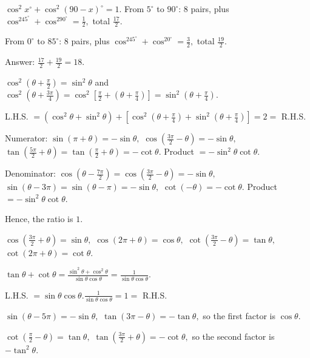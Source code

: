   $\cos^2x^\circ + \cos^2(90 - x)^\circ = 1.$ From $5^\circ$ to $90^\circ$: $8$ pairs, plus $\cos^245^\circ + \cos^290^\circ =
  \frac{1}{2},$ total $\frac{17}{2}.$

  From $0^\circ$ to $85^\circ$: $8$ pairs, plus $\cos^245^\circ + \cos^20^\circ = \frac{3}{2},$ total $\frac{19}{2}.$

  Answer: $\frac{17}{2} + \frac{19}{2} = 18.$

\item $\cos^2\left(\theta + \frac{\pi}{2}\right) = \sin^2\theta$ and $\cos^2\left(\theta + \frac{3\pi}{4}\right) =
  \cos^2\left[\frac{\pi}{2} + \left(\theta + \frac{\pi}{4}\right)\right] = \sin^2\left(\theta + \frac{\pi}{4}\right).$

  L.H.S. $= \left(\cos^2\theta + \sin^2\theta\right) + \left[\cos^2\left(\theta + \frac{\pi}{4}\right) + \sin^2\left(\theta +
  \frac{\pi}{4}\right)\right] = 2 =$ R.H.S.

\item Numerator: $\sin(\pi + \theta) = -\sin\theta,$ $\cos\left(\frac{3\pi}{2} - \theta\right) = -\sin\theta,$
  $\tan\left(\frac{5\pi}{2} + \theta\right) = \tan\left(\frac{\pi}{2} + \theta\right) = -\cot\theta.$ Product $=
  -\sin^2\theta\cot\theta.$

  Denominator: $\cos\left(\theta - \frac{7\pi}{2}\right) = \cos\left(\frac{3\pi}{2} - \theta\right) = -\sin\theta,$ $\sin(\theta -
  3\pi) = \sin(\theta - \pi) = -\sin\theta,$ $\cot(-\theta) = -\cot\theta.$ Product $= -\sin^2\theta\cot\theta.$

  Hence, the ratio is $1.$

\item $\cos\left(\frac{3\pi}{2} + \theta\right) = \sin\theta,$ $\cos(2\pi + \theta) = \cos\theta,$ $\cot\left(\frac{3\pi}{2} -
  \theta\right) = \tan\theta,$ $\cot(2\pi + \theta) = \cot\theta.$

  $\tan\theta + \cot\theta = \frac{\sin^2\theta + \cos^2\theta}{\sin\theta\cos\theta} = \frac{1}{\sin\theta\cos\theta}.$

  L.H.S. $= \sin\theta\cos\theta.\frac{1}{\sin\theta\cos\theta} = 1 =$ R.H.S.

\item $\sin(\theta - 5\pi) = -\sin\theta,$ $\tan(3\pi - \theta) = -\tan\theta,$ so the first factor is $\cos\theta.$

  $\cot\left(\frac{\pi}{2} - \theta\right) = \tan\theta,$ $\tan\left(\frac{3\pi}{2} + \theta\right) = -\cot\theta,$ so the second
  factor is $-\tan^2\theta.$

